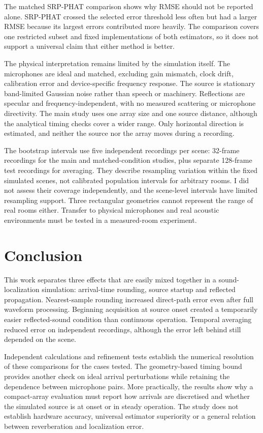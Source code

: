 \documentclass{edpsci}
\begin{document}
The matched SRP-PHAT comparison \citep{dibiase} shows why RMSE should not be reported alone. SRP-PHAT crossed the selected error threshold less often but had a larger RMSE because its largest errors contributed more heavily. The comparison covers one restricted subset and fixed implementations of both estimators, so it does not support a universal claim that either method is better.

The physical interpretation remains limited by the simulation itself. The microphones are ideal and matched, excluding gain mismatch, clock drift, calibration error and device-specific frequency response. The source is stationary band-limited Gaussian noise rather than speech or machinery. Reflections are specular and frequency-independent, with no measured scattering or microphone directivity. The main study uses one array size and one source distance, although the analytical timing checks cover a wider range. Only horizontal direction is estimated, and neither the source nor the array moves during a recording.

The bootstrap intervals use five independent recordings per scene: 32-frame recordings for the main and matched-condition studies, plus separate 128-frame test recordings for averaging. They describe resampling variation within the fixed simulated scenes, not calibrated population intervals for arbitrary rooms. I did not assess their coverage independently, and the scene-level intervals have limited resampling support. Three rectangular geometries cannot represent the range of real rooms either. Transfer to physical microphones and real acoustic environments must be tested in a measured-room experiment.

\section{Conclusion}

This work separates three effects that are easily mixed together in a sound-localization simulation: arrival-time rounding, source startup and reflected propagation. Nearest-sample rounding increased direct-path error even after full waveform processing. Beginning acquisition at source onset created a temporarily easier reflected-sound condition than continuous operation. Temporal averaging reduced error on independent recordings, although the error left behind still depended on the scene.

Independent calculations and refinement tests establish the numerical resolution of these comparisons for the cases tested. The geometry-based timing bound provides another check on ideal arrival perturbations while retaining the dependence between microphone pairs. More practically, the results show why a compact-array evaluation must report how arrivals are discretised and whether the simulated source is at onset or in steady operation. The study does not establish hardware accuracy, universal estimator superiority or a general relation between reverberation and localization error.
\end{document}
